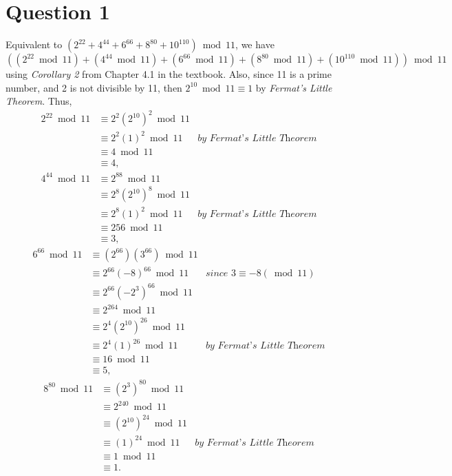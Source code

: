 \documentclass[12pt]{article}
\begin{document}
\section*{Question 1}
Equivalent to $(2^{22} + 4^{44} + 6^{66} + 8^{80} + 10^{110}) \bmod 11$, we have
\begin{equation}
    ((2^{22} \bmod 11) + (4^{44} \bmod 11) + (6^{66} \bmod 11) + (8^{80} \bmod 11) + (10^{110} \bmod 11)) \bmod 11 \label{eq:1}
\end{equation}
using \textit{Corollary 2} from Chapter 4.1 in the textbook. Also, since 11 is a prime number, and 2 is not divisible by 11, then $2^{10} \bmod 11 \equiv 1$ by \textit{Fermat's Little Theorem}. Thus,
\begin{align*}
    2^{22} \bmod 11 & \equiv 2^2 (2^{10})^{2} \bmod 11 & \\
    & \equiv 2^2 (1)^2 \bmod 11 & \textit{by Fermat's Little Theorem} \\
    & \equiv 4 \bmod 11 & \\
    & \equiv 4, & 
\end{align*}
\begin{align*}
    4^{44} \bmod 11 & \equiv 2^{88} \bmod 11 & \\
    & \equiv 2^8 (2^{10})^8 \bmod 11 & \\
    & \equiv 2^8 (1)^2 \bmod 11 & \textit{by Fermat's Little Theorem} \\
    & \equiv 256 \bmod 11 & \\
    & \equiv 3, & 
\end{align*}
\begin{align*}
    6^{66} \bmod 11 & \equiv (2^{66}) (3^{66}) \bmod 11 & \\
    & \equiv 2^{66} (-8)^{66} \bmod 11 & \textit{since $3 \equiv -8 (\bmod 11)$} \\
    & \equiv 2^{66} (-2^3)^{66} \bmod 11 & \\
    & \equiv 2^{264} \bmod 11 & \\
    & \equiv 2^4 (2^{10})^{26} \bmod 11 & \\
    & \equiv 2^4 (1)^{26} \bmod 11 & \textit{by Fermat's Little Theorem} \\
    & \equiv 16 \bmod 11 & \\
    & \equiv 5, & 
\end{align*}
\begin{align*}
    8^{80} \bmod 11 & \equiv (2^3)^{80} \bmod 11 & \\
    & \equiv 2^{240} \bmod 11 & \\
    & \equiv (2^{10})^{24} \bmod 11 & \\
    & \equiv (1)^{24} \bmod 11 & \textit{by Fermat's Little Theorem} \\
    & \equiv 1 \bmod 11 & \\
    & \equiv 1. & 
\end{align*}
\end{document}
